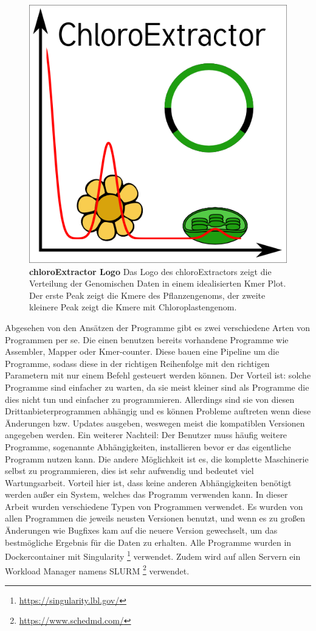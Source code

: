 \documentclass{scrartcl}
\begin{document}
\begin{figure}
\includegraphics[width=.6\linewidth]{./logo512.png}
\caption[chloroExtractor Logo]{\textbf{chloroExtractor Logo} Das Logo des chloroExtractors zeigt die Verteilung der Genomischen Daten in einem idealisierten Kmer Plot. Der erste Peak zeigt die Kmere des Pflanzengenoms, der zweite kleinere Peak zeigt die Kmere mit Chloroplastengenom.}
\end{figure}
Abgesehen von den Ansätzen der Programme gibt es zwei verschiedene Arten von Programmen per se. Die einen benutzen bereits vorhandene Programme wie Assembler, Mapper oder Kmer-counter. Diese 
bauen eine Pipeline um die Programme, sodass diese in der richtigen Reihenfolge mit den richtigen Parametern mit nur einem Befehl gesteuert werden können. Der Vorteil ist: solche Programme
sind einfacher zu warten, da sie meist kleiner sind als Programme die dies nicht tun und einfacher zu programmieren. Allerdings sind sie von diesen Drittanbieterprogrammen abhängig und es können Probleme 
auftreten wenn diese Änderungen bzw. Updates ausgeben, weswegen meist die kompatiblen Versionen angegeben werden. Ein weiterer Nachteil: Der Benutzer muss häufig weitere Programme, sogenannte Abhängigkeiten, installieren
bevor er das eigentliche Programm nutzen kann. Die andere Möglichkeit ist es, die komplette Maschinerie selbst zu programmieren, dies ist sehr aufwendig und bedeutet viel Wartungsarbeit. Vorteil hier
ist, dass keine anderen Abhängigkeiten benötigt werden außer ein System, welches das Programm verwenden kann. In dieser Arbeit wurden verschiedene Typen von Programmen verwendet.
Es wurden von allen Programmen die jeweils neusten Versionen benutzt, und wenn es zu großen Änderungen wie Bugfixes kam auf die neuere Version gewechselt, um das bestmögliche Ergebnis für die Daten
zu erhalten. Alle Programme wurden in Dockercontainer mit Singularity \footnote{\url{https://singularity.lbl.gov/}} verwendet. Zudem wird auf allen Servern ein Workload Manager namens SLURM \footnote{\url{https://www.schedmd.com/}
\clearpage} verwendet.
\end{document}
